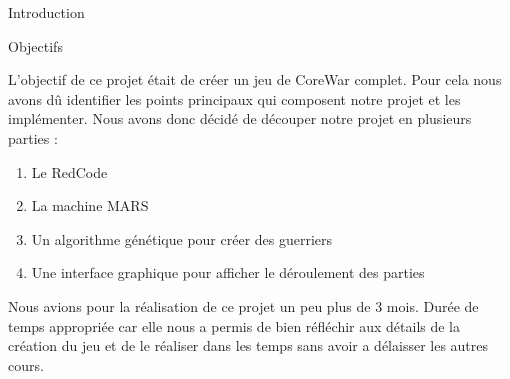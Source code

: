 \documentclass[a4paper, 10pt]{article}
\begin{document}
\begin{section}{Introduction}
        \begin{subsection}{Objectifs}
            \par
                L'objectif de ce projet était de créer un jeu de CoreWar complet. Pour cela nous avons dû identifier les points principaux qui composent notre projet et les implémenter. Nous avons donc décidé de découper notre projet en plusieurs parties :
                \smallskip
                \begin{enumerate}
                    \item Le RedCode
                    \item La machine MARS
                    \item Un algorithme génétique pour créer des guerriers
                    \item Une interface graphique pour afficher le déroulement des parties
                \end{enumerate}
                \medskip
                Nous avions pour la réalisation de ce projet un peu plus de 3 mois. Durée de temps appropriée car elle nous a permis de bien réfléchir aux détails de la création du jeu et de le réaliser dans les temps sans avoir a délaisser les autres cours.
                \bigskip
        \end{subsection}
    \end{section}
    
\end{document}
